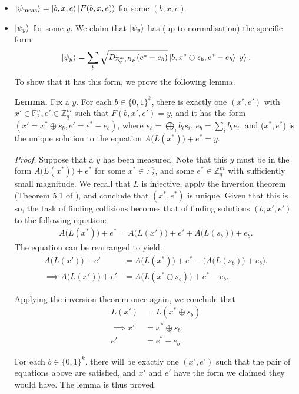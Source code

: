\documentclass{article}
\begin{document}
\begin{itemize}
		\item $\ket{\psi_{\mathrm{meas}}} = \ket{b, x, e} \ket{F(b, x, e)}$ for some $(b, x, e)$.
     \item $\ket{\psi_y}$ for some $y$. We claim that $\ket{\psi_y}$ has (up to normalisation) the specific form 
		\begin{align}
			\ket{\psi_y} = \sum_b \sqrt{D_{\mathbb{Z}_q^m, B_P}(e^* - e_b)} \ket{b, x^* \oplus s_b, e^* - e_b} \ket{y}.
		\end{align}
		To show that it has this form, we prove the following lemma.
		
		\textbf{Lemma.} Fix a $y$. For each $b \in \{0,1\}^k$, there is exactly one $(x', e')$ with $x' \in \mathbb{F}_2^n, e' \in \mathbb{Z}_q^m$ such that $F(b, x', e') = y$, and it has the form $(x' = x^* \oplus s_b, e' = e^* - e_b)$, where $s_b = \bigoplus_i b_i s_i$, $e_b = \sum_i b_i e_i$, and ($x^*, e^*$) is the unique solution to the equation $A\big( L(x^*) \big) + e^* = y$.

		\textit{Proof.} Suppose that a $y$ has been measured. Note that this $y$ must be in the form $A\big( L(x^*) \big) + e^*$ for some $x^* \in \mathbb{F}_2^n$, and some $e^* \in \mathbb{Z}_q^m$ with sufficiently small magnitude. We recall that $L$ is injective, apply the inversion theorem (Theorem 5.1 of \cite{MP11}), and conclude that $(x^*, e^*)$ is unique. Given that this is so, the task of finding collisions becomes that of finding solutions $(b, x', e')$ to the following equation:
		\begin{align}
			A\big( L(x^*) \big) + e^* = A\big( L(x') \big) + e' + A\big( L(s_{b}) \big) + e_{b}.
		\end{align}
		The equation can be rearranged to yield:
		\begin{align}
			A\big( L(x') \big) + e' &= A\big( L(x^*) \big) + e^* - \Big( A\big( L(s_{b}) \big) + e_{b} \Big). \\
			\implies A\big( L(x') \big) + e' &= A\big( L(x^* \oplus s_{b}) \big) + e^* - e_{b}.
		\end{align}

		Applying the inversion theorem once again, we conclude that
		\begin{align}
			L(x') &= L(x^* \oplus s_{b}) \\
			\implies x' &= x^* \oplus s_{b}; \\
			e' &= e^* - e_{b}.
		\end{align}

		For each $b \in \{0,1\}^k$, there will be exactly one $(x', e')$ such that the pair of equations above are satisfied, and $x'$ and $e'$ have the form we claimed they would have. The lemma is thus proved.


\end{itemize}
\end{document}
